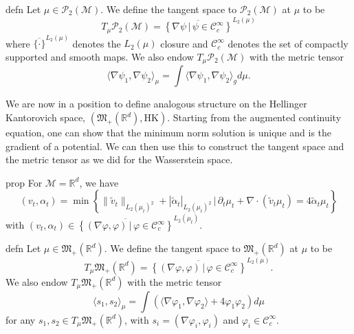 \documentclass{article}
\newcommand{\man}{\mathcal{M}}
\newcommand{\posm}{\mathfrak{M}_+(\mathbb{R}^d)}
\begin{document}
\begin{restatable}{defn}{}
    Let $\mu \in \mathcal{P}_2(\man)$. We define the tangent space to $\mathcal{P}_2(\man)$ at $\mu$ to be 
    \begin{equation}
        T_\mu \mathcal{P}_2(\man) = \overline{\left\{\nabla \psi \, | \, \psi \in \mathcal{C}_c^{\infty}\right\}}^{L_2(\mu)}
    \end{equation}
    where $\overline{\{\cdot \}}^{L_2(\mu)}$ denotes the $L_2(\mu)$ closure and $\mathcal{C}_c^{\infty}$ denotes the set of compactly supported and smooth maps. We also endow $T_\mu \mathcal{P}_2(\man)$ with the metric tensor
    \begin{equation}
        \langle \nabla \psi_1, \nabla \psi_2\rangle_{\mu} = \int \langle\nabla\psi_1, \nabla\psi_2 \rangle_g d\mu. 
    \end{equation}
\end{restatable}
We are now in a position to define analogous structure on the Hellinger Kantorovich space, $(\posm, \text{HK})$. Starting from the augmented continuity equation, one can show that the minimum norm solution is unique and is the gradient of a potential. We can then use this to construct the tangent space and the metric tensor as we did for the Wasserstein space.
\begin{restatable}{prop}{}
    For $\man = \mathbb{R}^d$, we have
    \begin{equation*}
        (v_t, \alpha_t) = \min\left\{\|\tilde v_t\|_{L_2(\mu_t)^2} + |\tilde \alpha_t|_{L_2(\mu_t)^2  }  \, \Big| \, \partial_t\mu_t + \nabla \cdot (\tilde v_t \mu_t) = 4\tilde \alpha_t \mu_t\right\}
    \end{equation*}
    with $(v_t, \alpha_t) \in \overline{\left\{(\nabla \varphi, \varphi) \, | \, \varphi \in \mathcal{C}^{\infty}_{c}\right\}}^{L_2(\mu_t)}$.
\end{restatable}
\begin{restatable}{defn}{}
    Let $\mu \in \posm$. We define the tangent space to $\posm$ at $\mu$ to be 
    \begin{equation}
        T_\mu \posm = \overline{\left\{(\nabla \varphi, \varphi) \, | \, \varphi \in \mathcal{C}_c^{\infty}\right\}}^{L_2(\mu)}.
    \end{equation}
    We also endow $T_\mu \posm$ with the metric tensor
    \begin{equation}
        \langle s_1,  s_2\rangle_{\mu} = \int \left(\langle\nabla\varphi_1, \nabla\varphi_2\rangle + 4\varphi_1\varphi_2 \right) d\mu
    \end{equation}
    for any $s_1, s_2\in T_\mu \posm$, with $s_i = (\nabla \varphi_i, \varphi_i)$ and $\varphi_i \in \mathcal{C}_c^\infty$. 
\end{restatable}
\end{document}

